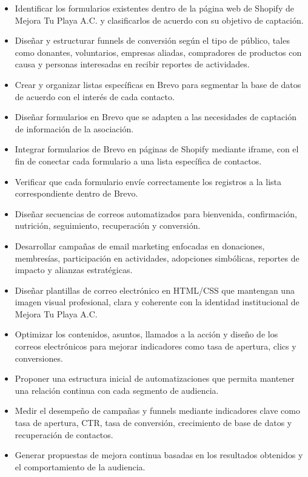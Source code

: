 \begin{itemize}
    \item Identificar los formularios existentes dentro de la página web de Shopify de Mejora Tu Playa A.C. y clasificarlos de acuerdo con su objetivo de captación.
    \item Diseñar y estructurar funnels de conversión según el tipo de público, tales como donantes, voluntarios, empresas aliadas, compradores de productos con causa y personas interesadas en recibir reportes de actividades.
    \item Crear y organizar listas específicas en Brevo para segmentar la base de datos de acuerdo con el interés de cada contacto.
    \item Diseñar formularios en Brevo que se adapten a las necesidades de captación de información de la asociación.
    \item Integrar formularios de Brevo en páginas de Shopify mediante iframe, con el fin de conectar cada formulario a una lista específica de contactos.
    \item Verificar que cada formulario envíe correctamente los registros a la lista correspondiente dentro de Brevo.
    \item Diseñar secuencias de correos automatizados para bienvenida, confirmación, nutrición, seguimiento, recuperación y conversión.
    \item Desarrollar campañas de email marketing enfocadas en donaciones, membresías, participación en actividades, adopciones simbólicas, reportes de impacto y alianzas estratégicas.
    \item Diseñar plantillas de correo electrónico en HTML/CSS que mantengan una imagen visual profesional, clara y coherente con la identidad institucional de Mejora Tu Playa A.C.
    \item Optimizar los contenidos, asuntos, llamados a la acción y diseño de los correos electrónicos para mejorar indicadores como tasa de apertura, clics y conversiones.
    \item Proponer una estructura inicial de automatizaciones que permita mantener una relación continua con cada segmento de audiencia.
    \item Medir el desempeño de campañas y funnels mediante indicadores clave como tasa de apertura, CTR, tasa de conversión, crecimiento de base de datos y recuperación de contactos.
    \item Generar propuestas de mejora continua basadas en los resultados obtenidos y el comportamiento de la audiencia.
\end{itemize}

